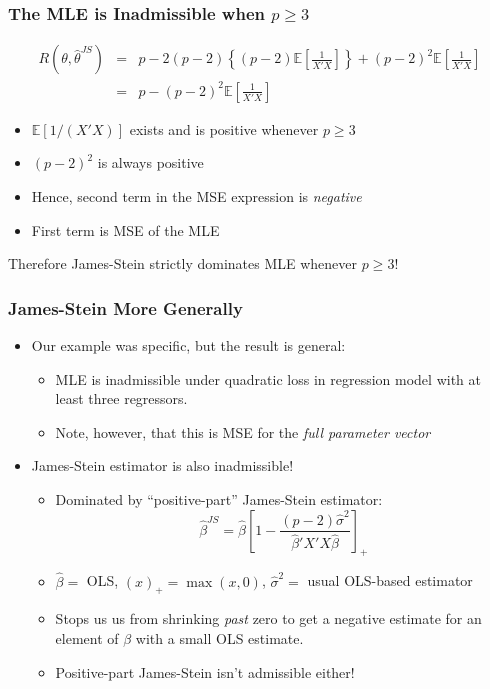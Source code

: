 \begin{frame}
  \frametitle{The MLE is Inadmissible when $p\geq 3$}
  \small
\begin{eqnarray*}
  R\left(\theta, \hat{\theta}^{JS} \right) &=& p - 2(p-2)\left\{ \left( p-2 \right) \mathbb{E}\left[ \frac{1}{X'X} \right] \right\} + \left( p-2 \right)^{2}\mathbb{E}\left[ \frac{1}{X'X} \right]\\
  &=& p - \left( p-2 \right)^2 \mathbb{E}\left[ \frac{1}{X'X} \right]
\end{eqnarray*}

\vspace{-1em}
\begin{itemize}
  \item $\mathbb{E}[1/(X'X)]$ exists and is positive whenever $p \geq 3$
  \item $(p-2)^2$ is always positive
  \item Hence, second term in the MSE expression is \emph{negative}
  \item First term is MSE of the MLE 
\end{itemize}


\alert{Therefore James-Stein strictly dominates MLE whenever $p\geq 3$!}
\end{frame}
\begin{frame}
  \frametitle{James-Stein More Generally}
  \begin{itemize}
    \item Our example was specific, but the result is general:
      \begin{itemize}
        \item MLE is inadmissible under quadratic loss in regression model with at least three regressors.
        \item Note, however, that this is MSE for the \emph{full parameter vector}
      \end{itemize}
    \item James-Stein estimator is also inadmissible!
      \begin{itemize}
        \item Dominated by ``positive-part'' James-Stein estimator:
$$\widehat{\beta}^{JS} = \widehat{\beta}\left[1 -\frac{(p-2)\widehat{\sigma}^2}{\widehat{\beta}'X'X \widehat{\beta}} \right]_+$$
\item $\widehat{\beta} = $ OLS, $(x)_+ = \max(x,0)$, $\widehat{\sigma}^2 =$ usual OLS-based estimator
\item Stops us us from shrinking \emph{past} zero to get a negative estimate for an element of $\beta$ with a small OLS estimate.
\item Positive-part James-Stein isn't admissible either!
      \end{itemize}
  \end{itemize}
  
\end{frame}
